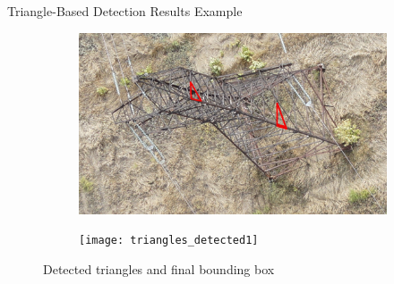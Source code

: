 \documentclass{beamer}
\begin{document}
\begin{frame}[t, fragile]{Triangle-Based Detection Results Example}
\begin{figure}
\centering
\begin{subfigure}{.5\textwidth}
\centering
\includegraphics[scale=0.15]{triangles_volg2}
\end{subfigure}%
\begin{subfigure}{.5\textwidth}
\centering
\texttt{[image: triangles\_detected1]}

\end{subfigure}
\captionsetup{labelformat=empty}
\caption{Detected triangles and final bounding box}
\end{figure}
\end{frame}
\end{document}
